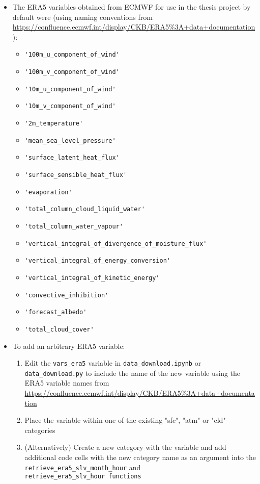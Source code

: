 \begin{itemize}
	\item The ERA5 variables obtained from \ac{ECMWF} for use in the thesis project by default were (using naming conventions from \url{https://confluence.ecmwf.int/display/CKB/ERA5%3A+data+documentation}):
		\begin{itemize}
			\item \verb+'100m_u_component_of_wind'+
			\item \verb+'100m_v_component_of_wind'+
			\item \verb+'10m_u_component_of_wind'+
			\item \verb+'10m_v_component_of_wind'+
			\item \verb+'2m_temperature'+
			\item \verb+'mean_sea_level_pressure'+
			\item \verb+'surface_latent_heat_flux'+
			\item \verb+'surface_sensible_heat_flux'+
			\item \verb+'evaporation'+
			\item \verb+'total_column_cloud_liquid_water'+
			\item \verb+'total_column_water_vapour'+
			\item \verb+'vertical_integral_of_divergence_of_moisture_flux'+
			\item \verb+'vertical_integral_of_energy_conversion'+
			\item \verb+'vertical_integral_of_kinetic_energy'+
			\item \verb+'convective_inhibition'+
			\item \verb+'forecast_albedo'+
			\item \verb+'total_cloud_cover'+
		\end{itemize}
	\item To add an arbitrary \ac{ERA5} variable:
	\begin{enumerate}
		\item Edit the \verb+vars_era5+ variable in \verb+data_download.ipynb+ or \\ \verb+data_download.py+ to include the name of the new variable using the \ac{ERA5} variable names from \url{https://confluence.ecmwf.int/display/CKB/ERA5%3A+data+documentation}
		\item Place the variable within one of the existing "sfc", "atm" or "cld" categories
		\item (Alternatively) Create a new category with the variable and add additional code cells with the new category name as an argument into the \\ \verb+retrieve_era5_slv_month_hour+ and \\ \verb+retrieve_era5_slv_hour functions+

\end{enumerate}
\end{itemize}
